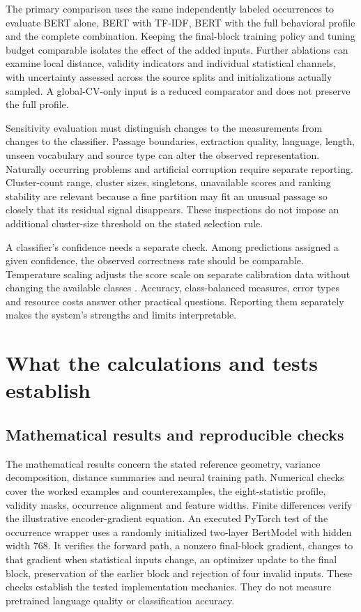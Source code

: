 \documentclass[10pt,letterpaper]{article}
\begin{document}
The primary comparison uses the same independently labeled occurrences to evaluate BERT alone, BERT with TF-IDF, BERT with the full behavioral profile and the complete combination. Keeping the final-block training policy and tuning budget comparable isolates the effect of the added inputs. Further ablations can examine local distance, validity indicators and individual statistical channels, with uncertainty assessed across the source splits and initializations actually sampled. A global-CV-only input is a reduced comparator and does not preserve the full profile.\par

Sensitivity evaluation must distinguish changes to the measurements from changes to the classifier. Passage boundaries, extraction quality, language, length, unseen vocabulary and source type can alter the observed representation. Naturally occurring problems and artificial corruption require separate reporting. Cluster-count range, cluster sizes, singletons, unavailable scores and ranking stability are relevant because a fine partition may fit an unusual passage so closely that its residual signal disappears. These inspections do not impose an additional cluster-size threshold on the stated selection rule.\par

A classifier's confidence needs a separate check. Among predictions assigned a given confidence, the observed correctness rate should be comparable. Temperature scaling adjusts the score scale on separate calibration data without changing the available classes \cite{guo}. Accuracy, class-balanced measures, error types and resource costs answer other practical questions. Reporting them separately makes the system's strengths and limits interpretable.\par

\section{What the calculations and tests establish}
\subsection{Mathematical results and reproducible checks}
The mathematical results concern the stated reference geometry, variance decomposition, distance summaries and neural training path. Numerical checks cover the worked examples and counterexamples, the eight-statistic profile, validity masks, occurrence alignment and feature widths. Finite differences verify the illustrative encoder-gradient equation. An executed PyTorch test of the occurrence wrapper uses a randomly initialized two-layer BertModel with hidden width 768. It verifies the forward path, a nonzero final-block gradient, changes to that gradient when statistical inputs change, an optimizer update to the final block, preservation of the earlier block and rejection of four invalid inputs. These checks establish the tested implementation mechanics. They do not measure pretrained language quality or classification accuracy.\par
\end{document}
